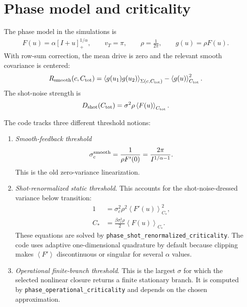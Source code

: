 \documentclass[pre,preprint,preprintnumbers,aps,eqsecnum,superscriptaddress,notitlepage,showpacs,floatfix]{revtex4-1}
\newcommand{\avg}[1]{\left\langle #1 \right\rangle}
\begin{document}
\section{Phase model and criticality}
\label{sec:phase_model}

The phase model in the simulations is
\begin{align}
F(u)=\alpha[I+u]_+^{1/\alpha},
\qquad
v_T=\pi,
\qquad
\rho=\frac1{2\pi},
\qquad
g(u)=\rho F(u).
\label{eq:phase_model_F}
\end{align}
With row-sum correction, the mean drive is zero and the relevant smooth
covariance is centered:
\begin{align}
R_{\rm smooth}(c,C_{\rm tot})
=
\avg{g(u_1)g(u_2)}_{\Sigma(c,C_{\rm tot})}
-
\avg{g(u)}_{C_{\rm tot}}^2.
\end{align}
The shot-noise strength is
\begin{align}
D_{\rm shot}(C_{\rm tot})
=
\sigma^2\rho\avg{F(u)}_{C_{\rm tot}}.
\end{align}

The code tracks three different threshold notions:
\begin{enumerate}
\item \emph{Smooth-feedback threshold}
\begin{align}
\sigma_c^{\rm smooth}
=
\frac{1}{\rho F'(0)}
=
\frac{2\pi}{I^{1/\alpha-1}}.
\label{eq:sigma_smooth}
\end{align}
This is the old zero-variance linearization.

\item \emph{Shot-renormalized static threshold}.  This accounts for the
shot-noise-dressed variance below transition:
\begin{align}
1
&=
\sigma_c^2\rho^2
\avg{F'(u)}_{C_*}^2,
\label{eq:sigma_shot_a}\\
C_*
&=
\frac{\beta\sigma_c^2\rho}{2}
\avg{F(u)}_{C_*}.
\label{eq:sigma_shot_b}
\end{align}
These equations are solved by
\texttt{phase\_shot\_renormalized\_criticality}.  The code uses adaptive
one-dimensional quadrature by default because clipping makes
$\avg{F'}$ discontinuous or singular for several $\alpha$ values.

\item \emph{Operational finite-branch threshold}.  This is the largest
$\sigma$ for which the selected nonlinear closure returns a finite stationary
branch.  It is computed by \texttt{phase\_operational\_criticality} and
depends on the chosen approximation.
\end{enumerate}
\end{document}

